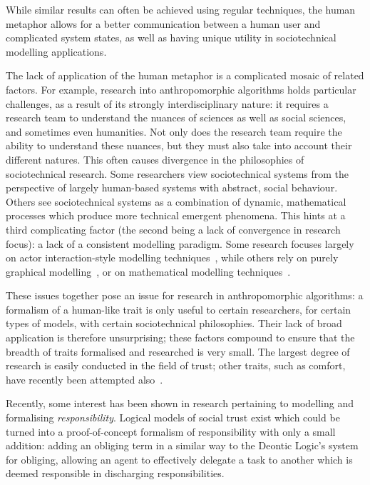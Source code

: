 While similar results can often be achieved using regular techniques, the human metaphor allows for a better communication between a human user and complicated system states, as well as having unique utility in sociotechnical modelling applications.\par

The lack of application of the human metaphor is a complicated mosaic of related factors. For example, research into anthropomorphic algorithms holds particular challenges, as a result of its strongly interdisciplinary nature: it requires a research team to understand the nuances of sciences as well as social sciences, and sometimes even humanities. Not only does the research team require the ability to understand these nuances, but they must also take into account their different natures. This often causes divergence in the philosophies of sociotechnical research. Some researchers view sociotechnical systems from the perspective of largely human-based systems with abstract, social behaviour. Others see sociotechnical systems as a combination of dynamic, mathematical processes which produce more technical emergent phenomena. This hints at a third complicating factor (the second being a lack of convergence in research focus): a lack of a consistent modelling paradigm. Some research focuses largely on actor interaction-style modelling techniques~\cite{baxter2011socio}, while others rely on purely graphical modelling~\cite{ObashiMethodology}, or on mathematical modelling techniques~\cite{vespignani2012modelling}. \par

These issues together pose an issue for research in anthropomorphic algorithms: a formalism of a human-like trait is only useful to certain researchers, for certain types of models, with certain sociotechnical philosophies. Their lack of broad application is therefore unsurprising; these factors compound to ensure that the breadth of traits formalised and researched is very small. The largest degree of research is easily conducted in the field of trust; other traits, such as comfort, have recently been attempted also~\cite{marsh2011defining}.\par

Recently, some interest has been shown in research pertaining to modelling and formalising \emph{responsibility}\cite{berreby2015modelling,sommerville_dependable_systems_chap_8,Simpson2011}. Logical models of social trust exist which could be turned into a proof-of-concept formalism of responsibility with only a small addition: adding an obliging term in a similar way to the Deontic Logic's system for obliging\cite{deontic-logic}, allowing an agent to effectively delegate a task to another which is deemed responsible in discharging responsibilities.\par

